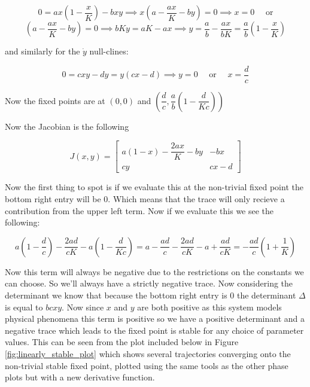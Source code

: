 \documentclass[11pt]{report}
\begin{document}
\begin{enumerate}[label=\alph*)]
			$$
			0 = ax\left(1-\dfrac{x}{K}\right) - bxy \implies x\left(a-\dfrac{ax}{K} - by\right) = 0 \implies x = 0 \quad \text{ or} 
			$$
			$$
			\left(a-\dfrac{ax}{K} - by\right) = 0 \implies bKy = aK-ax \implies y = \frac{a}{b} - \frac{ax}{bK} = \dfrac{a}{b}\left(1-\frac{x}{K}\right)
			$$
			
			and similarly for the $\dot{y}$ null-clines:
			
			$$
			0 = cxy - dy = y(cx -d) \implies y = 0 \quad \text{ or } \quad x = \frac{d}{c}
			$$
			
			Now the fixed points are at $(0,0)$ and $\left(\dfrac{d}{c}, \dfrac{a}{b}\left(1-\dfrac{d}{Kc}\right)\right)$
			
			Now the Jacobian is the following 
			
			$$
			J(x,y) = \begin{bmatrix}
				a(1-x) - \dfrac{2ax}{K}-by & -bx \\
				cy & cx - d 
			\end{bmatrix}
			$$
			
			Now the first thing to spot is if we evaluate this at the non-trivial fixed point the bottom right entry will be 0. Which means that the trace will only recieve a contribution from the upper left term. Now if we evaluate this we see the following:
			
			$$
			a\left(1 - \frac{d}{c}\right) - \dfrac{2ad}{cK} - a\left(1-\dfrac{d}{Kc}\right) = a - \dfrac{ad}{c} - \dfrac{2ad}{cK} - a + \dfrac{ad}{cK} = -\dfrac{ad}{c}\left(1 + \dfrac{1}{K}\right)
			$$
			
			Now this term will always be negative due to the restrictions on the constants we can choose. So we'll always have a strictly negative trace. Now considering the determinant we know that because the bottom right entry is $0$ the determinant $\Delta$ is equal to $bcxy$. Now since $x$ and $y$ are both positive as this system models physical phenomena this term is positive so we have a positive determinant and a negative trace which leads to the fixed point is stable for any choice of parameter values. This can be seen from the plot included below in Figure \ref{fig:linearly_stable_plot} which shows several trajectories converging onto the non-trivial stable fixed point, plotted using the same tools as the other phase plots but with a new derivative function.
			

\end{enumerate}
\end{document}

